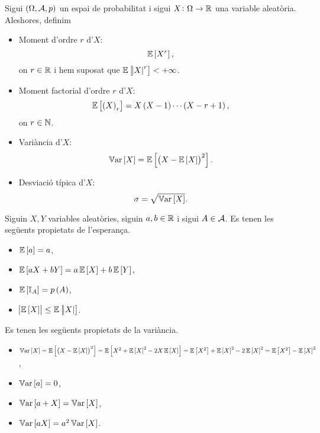 \begin{defi}
    Sigui $\lp\Omega,\Asuc,p\rp$ un espai de probabilitat i sigui $X\colon\Omega\to\real$ una variable aleatòria. Aleshores, definim
    \begin{itemize}
        \item Moment d'ordre $r$ d'$X$: 
            \[
                \esp\lb X^r\rb,
            \]
            on $r\in\real$ i hem suposat que $\esp\lb\abs{X}^r\rb<+\infty$.
        \item Moment factorial d'ordre $r$ d'$X$: 
            \[
                \esp\lb \lp X\rp_r\rb=X\lp X-1\rp\cdots\lp X-r+1\rp,
            \]
            on $r\in\n$.
        \item Variància d'$X$:
            \[
                \var\lb X\rb=\esp\lb\lp X-\esp\lb X\rb\rp^2\rb.
            \]
        \item Desviació típica d'$X$:
            \[
                \sigma=\sqrt{\var\lb X\rb}.
            \]
    \end{itemize}
\end{defi}

\begin{prop}
    Siguin $X, Y$ variables aleatòries, siguin $a, b\in\real$ i sigui $A\in\Asuc$. Es tenen les següents propietats de l'esperança.
    \begin{itemize}
        \item $\esp\lb a\rb=a$,
        \item $\esp\lb aX+bY\rb=a\esp\lb X\rb+b\esp\lb Y\rb$,
        \item $\esp\lb \mathbb{I}_A\rb=p\lp A\rp$,
        \item $\abs{\esp\lb X\rb}\leq\esp\lb\abs{X}\rb$.
    \end{itemize}
    Es tenen les següents propietats de la variància.
    \begin{itemize}
        \item $\var\lb X\rb=\esp\lb\lp X-\esp\lb X\rb\rp^2\rb=\esp\lb X^2+\esp\lb X\rb^2-2X\esp\lb X\rb\rb=\esp\lb X^2\rb+\esp\lb X\rb^2-2\esp\lb X\rb^2=\esp\lb X^2\rb-\esp\lb X\rb^2$,
        \item $\var\lb a\rb=0$,
        \item $\var\lb a+X\rb=\var\lb X\rb$,
        \item $\var\lb aX\rb=a^2\var\lb X\rb$.
    \end{itemize}
\end{prop}

